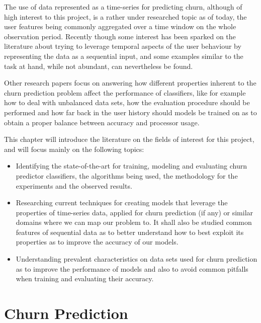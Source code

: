 \documentclass{kththesis}
\begin{document}
The use of data represented as a time-series for predicting churn, although of high interest to this project, is a rather under researched topic as of today, the user features being commonly aggregated over a time window on the whole observation period. Recently though some interest has been sparked on the literature about trying to leverage temporal aspects of the user behaviour by representing the data as a sequential input, and some examples similar to the task at hand, while not abundant, can nevertheless be found. 

Other research papers focus on answering how different properties inherent to the churn prediction problem affect the performance of classifiers, like for example how to deal with unbalanced data sets, how the evaluation procedure should be performed and how far back in the user history should models be trained on as to obtain a proper balance between accuracy and processor usage.  

This chapter will introduce the literature on the fields of interest for this project, and will focus mainly on the following topics:

\begin{itemize}
\item Identifying the state-of-the-art for training, modeling and evaluating churn predictor classifiers, the algorithms being used, the methodology for the experiments and the observed results.

\item Researching current techniques for creating models that leverage the properties of time-series data, applied for churn prediction (if any) or similar domains where we can map our problem to. It shall also be studied common features of sequential data as to better understand how to best exploit its properties as to improve the accuracy of our models.

\item Understanding prevalent characteristics on data sets used for churn prediction as to improve the performance of models and also to avoid common pitfalls when training and evaluating their accuracy.
 
\end{itemize}


\section{Churn Prediction}
\end{document}
